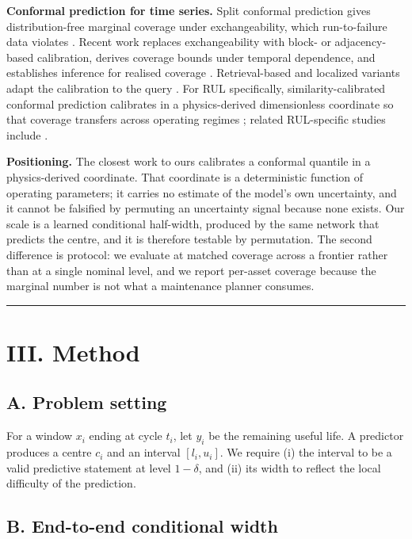 \textbf{Conformal prediction for time series.} Split conformal prediction gives distribution-free marginal coverage under exchangeability, which run-to-failure data violates \citep{barber2023}. Recent work replaces exchangeability with block- or adjacency-based calibration, derives coverage bounds under temporal dependence, and establishes inference for realised coverage \citep{zhai2026a, zhai2026b, lee2026}. Retrieval-based and localized variants adapt the calibration to the query \citep{jin2026}. For RUL specifically, similarity-calibrated conformal prediction calibrates in a physics-derived dimensionless coordinate so that coverage transfers across operating regimes \citep{busico2026}; related RUL-specific studies include \citep{wu2025, sensors2026, yang2026}.

\textbf{Positioning.} The closest work to ours calibrates a conformal quantile in a physics-derived coordinate. That coordinate is a deterministic function of operating parameters; it carries no estimate of the model's own uncertainty, and it cannot be falsified by permuting an uncertainty signal because none exists. Our scale is a learned conditional half-width, produced by the same network that predicts the centre, and it is therefore testable by permutation. The second difference is protocol: we evaluate at matched coverage across a frontier rather than at a single nominal level, and we report per-asset coverage because the marginal number is not what a maintenance planner consumes.

\begin{center}\rule{0.5\linewidth}{0.5pt}\end{center}

\section{III. Method}\label{iii.-method}

\subsection{A. Problem setting}\label{a.-problem-setting}

For a window \(x_i\) ending at cycle \(t_i\), let \(y_i\) be the remaining useful life. A predictor produces a centre \(c_i\) and an interval \([l_i, u_i]\). We require (i) the interval to be a valid predictive statement at level \(1-\delta\), and (ii) its width to reflect the local difficulty of the prediction.

\subsection{B. End-to-end conditional width}\label{b.-end-to-end-conditional-width}

